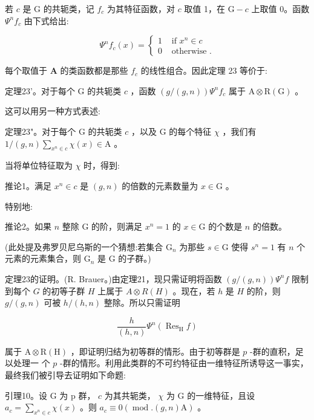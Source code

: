 \documentclass[10pt]{article}
\begin{document}
若 \(c\) 是 \(\mathrm{G}\) 的共轭类，记 \({f}_{c}\) 为其特征函数，对 \(c\) 取值 1，在 \(\mathrm{G} - c\) 上取值 0。函数 \({\Psi }^{n}{f}_{c}\) 由下式给出:

\[
{\Psi }^{n}{f}_{c}\left( x\right)  = \left\{  \begin{array}{ll} 1 & \text{ if }{x}^{n} \in  c \\  0 & \text{ otherwise }. \end{array}\right.
\]

每个取值于 \(\mathbf{A}\) 的类函数都是那些 \({f}_{c}\) 的线性组合。因此定理 23 等价于:

定理23’。对于每个 \(\mathrm{G}\) 的共轭类 \(c\) ，函数 \(\left( {g/\left( {g,n}\right) }\right) {\Psi }^{n}{f}_{c}\) 属于 \(\mathrm{A} \otimes  \mathrm{R}\left( \mathrm{G}\right)\) 。

这可以用另一种方式表述:

定理23"。对于每个 \(\mathrm{G}\) 的共轭类 \(c\) ，以及 \(\mathrm{G}\) 的每个特征 \(\chi\) ，我们有 \(1/\left( {g,n}\right) \mathop{\sum }\limits_{{{x}^{n} \in  c}}\chi \left( x\right)  \in  \mathrm{A}\) 。

当将单位特征取为 \(\chi\) 时，得到:

推论1。满足 \({x}^{n} \in  c\) 是 \(\left( {g,n}\right)\) 的倍数的元素数量为 \(x \in  \mathrm{G}\) 。

特别地:

推论2。如果 \(n\) 整除 \(\mathrm{G}\) 的阶，则满足 \({x}^{n} = 1\) 的 \(x \in  \mathrm{G}\) 的个数是 \(n\) 的倍数。

(此处提及弗罗贝尼乌斯的一个猜想:若集合 \({\mathrm{G}}_{n}\) 为那些 \(s \in  \mathrm{G}\) 使得 \({s}^{n} = 1\) 有 \(n\) 个元素的元素集合，则 \({\mathrm{G}}_{n}\) 是 \(\mathrm{G}\) 的子群。)

定理23的证明。(R. Brauer。)由定理21，现只需证明将函数 \(\left( {g/\left( {g,n}\right) }\right) {\Psi }^{n}f\) 限制到每个 \(G\) 的初等子群 \(H\) 上属于 \(A \otimes  R\left( H\right)\) 。现在，若 \(h\) 是 \(H\) 的阶，则 \(g/\left( {g,n}\right)\) 可被 \(h/\left( {h,n}\right)\) 整除。所以只需证明

\[
\frac{h}{\left( h,n\right) }{\Psi }^{n}\left( {{\operatorname{Res}}_{\mathrm{H}}f}\right)
\]

属于 \(\mathrm{A} \otimes  \mathrm{R}\left( \mathrm{H}\right)\) ，即证明归结为初等群的情形。由于初等群是 \(p\) -群的直积，足以处理一 个 \(p\) -群的情形。利用此类群的不可约特征由一维特征所诱导这一事实，最终我们被引导去证明如下命题:

引理10。设 \(\mathrm{G}\) 为 p 群， \(c\) 为其共轭类， \(\chi\) 为 \(\mathrm{G}\) 的一维特征，且设 \({a}_{c} = \mathop{\sum }\limits_{{{x}^{n} \in  c}}\chi \left( x\right)\) 。则 \({a}_{c} \equiv  0\left( {\operatorname{mod}.\left( {g,n}\right) \mathrm{A}}\right)\) 。
\end{document}

